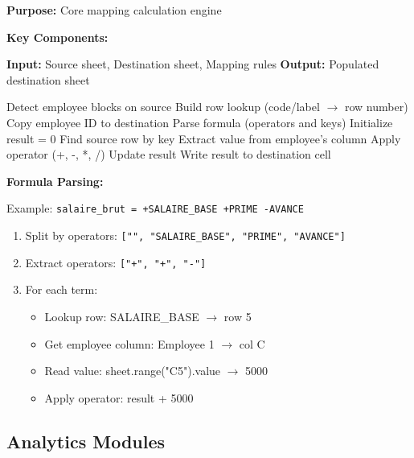 \textbf{Purpose:} Core mapping calculation engine

\textbf{Key Components:}

\begin{algorithm}[H]
\caption{Mapping Application Algorithm}
\begin{algorithmic}[1]
\State \textbf{Input:} Source sheet, Destination sheet, Mapping rules
\State \textbf{Output:} Populated destination sheet

    \State Detect employee blocks on source
    \State Build row lookup (code/label $\rightarrow$ row number)
        \State Copy employee ID to destination
            \State Parse formula (operators and keys)
            \State Initialize result = 0
                \State Find source row by key
                \State Extract value from employee's column
                \State Apply operator (+, -, *, /)
                \State Update result
            \EndFor
            \State Write result to destination cell
        \EndFor
    \EndFor
\EndFor
\end{algorithmic}
\end{algorithm}

\textbf{Formula Parsing:}

Example: \texttt{salaire\_brut = +SALAIRE\_BASE +PRIME -AVANCE}

\begin{enumerate}
    \item Split by operators: \texttt{["", "SALAIRE\_BASE", "PRIME", "AVANCE"]}
    \item Extract operators: \texttt{["+", "+", "-"]}
    \item For each term:
    \begin{itemize}
        \item Lookup row: SALAIRE\_BASE $\rightarrow$ row 5
        \item Get employee column: Employee 1 $\rightarrow$ col C
        \item Read value: sheet.range("C5").value $\rightarrow$ 5000
        \item Apply operator: result + 5000
    \end{itemize}
\end{enumerate}

\subsection{Analytics Modules}


